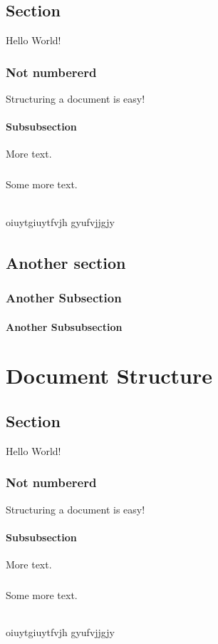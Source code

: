 \documentclass{book}
\begin{document}
	\section{Section}
	Hello World!
	\subsection*{Not numbererd}
	Structuring a document is easy!
	\subsubsection{Subsubsection}
	More text.
	\paragraph{}
	Some more text.
	\subparagraph{}
	oiuytgiuytfvjh gyufvjjgjy
	
	\subparagraph{}
	\lipsum[1]
	\section{Another section}
	\subsection{Another Subsection}
	\subsubsection{Another Subsubsection}
	\lipsum[1-3]
\chapter{Document Structure}
	\section{Section}
	Hello World!
	\subsection*{Not numbererd}
	Structuring a document is easy!
	\subsubsection{Subsubsection}
	More text.
	\paragraph{}
	Some more text.
	\subparagraph{}
	oiuytgiuytfvjh gyufvjjgjy
	
\end{document}
